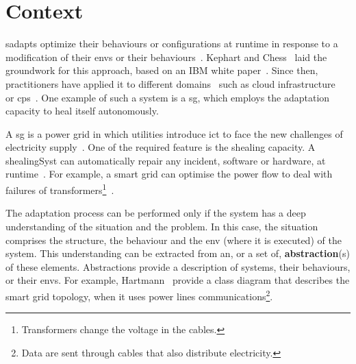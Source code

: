 \section{Context}

\Glspl{sadapt} optimize their \glspl{behaviour} or configurations at runtime in response to a modification of their \glspl{env} or their \glspl{behaviour}~\cite{DBLP:conf/dagstuhl/ChengLGIMABBBCSDFGGGKKKLMMMPSTTWW09}.
Kephart and Chess~\cite{DBLP:journals/computer/KephartC03} laid the groundwork for this approach, based on an IBM white paper~\cite{computing2006architectural}.
Since then, practitioners have applied it to different domains~\cite{DBLP:journals/corr/abs-1904-01518} such as cloud infrastructure~\cite{DBLP:conf/icac/JavadiG17, OpenStack:Watcher:Wiki, DBLP:conf/icse/BarnaKFL17} or \gls{cps}~\cite{DBLP:conf/icac/LalandaGC17, DBLP:conf/cbse/FouquetMFBPJ12, DBLP:conf/smartgridsec/0001FKNT14}.
One example of such a system is a \gls{sg}, which employs the adaptation capacity to heal itself autonomously.

A \gls{sg} is a power grid in which utilities introduce \gls{ict} to face the new challenges of electricity supply~\cite{farhangi2010path, ipakchi2009grid, DBLP:journals/comsur/FangMXY12}.
One of the required feature is the \gls{shealing} capacity.
A \gls{shealingSyst} can automatically repair any incident, software or hardware, at runtime~\cite{DBLP:journals/computer/KephartC03}.
For example, a smart grid can optimise the power flow to deal with failures of transformers\footnote{Transformers change the voltage in the cables.}~\cite{DBLP:journals/comsur/FangMXY12}.

The adaptation process can be performed only if the system has a deep understanding of the situation and the problem.
In this case, the situation comprises the \gls{structure}, the \gls{behaviour} and the \gls{env} (where it is executed) of the system.
This understanding can be extracted from an, or a set of, \textbf{abstraction}(s) of these elements.
Abstractions provide a description of systems, their \glspl{behaviour}, or their \glspl{env}.
For example, Hartmann~\etal \cite{DBLP:conf/smartgridcomm/0001FKTPTR14} provide a class diagram that describes the smart grid topology, when it uses power lines communications\footnote{Data are sent through cables that also distribute electricity.}.


